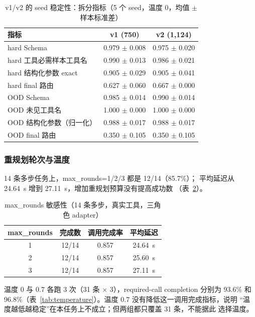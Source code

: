 \documentclass[UTF8,a4paper,12pt]{ctexart}
\begin{document}
\begin{table}[H]
  \centering
  \small
  \caption{v1/v2 的 seed 稳定性：拆分指标（5 个 seed，温度 0，均值 $\pm$ 样本标准差）}
  \label{tab:seed}
  \begin{tabular}{lcc}
    \toprule
    指标 & v1 (750) & v2 (1,124) \\
    \midrule
    hard Schema & 0.979 $\pm$ 0.008 & 0.975 $\pm$ 0.020 \\
    hard 工具必需样本工具名 & 0.990 $\pm$ 0.013 & 0.986 $\pm$ 0.021 \\
    hard 结构化参数 exact & 0.905 $\pm$ 0.029 & 0.905 $\pm$ 0.041 \\
    hard final 路由 & 0.627 $\pm$ 0.060 & 0.667 $\pm$ 0.000 \\
    OOD Schema & 0.985 $\pm$ 0.014 & 0.990 $\pm$ 0.014 \\
    OOD 未见工具名 & 1.000 $\pm$ 0.000 & 1.000 $\pm$ 0.000 \\
    OOD 结构化参数（归一化） & 0.988 $\pm$ 0.017 & 0.988 $\pm$ 0.017 \\
    OOD final 路由 & 0.350 $\pm$ 0.105 & 0.350 $\pm$ 0.105 \\
    \bottomrule
  \end{tabular}
\end{table}

\subsubsection{重规划轮次与温度}

14 条多步任务上，max\_rounds=1/2/3 都是 12/14（85.7\%）；
平均延迟从 24.64~s 增到 27.11~s，增加重规划预算没有提高成功数
（表~\ref{tab:rounds}）。

\begin{table}[H]
  \centering
  \small
  \caption{max\_rounds 敏感性（14 条多步，真实工具，三角色 adapter）}
  \label{tab:rounds}
  \begin{tabular}{cccc}
    \toprule
    max\_rounds & 完成数 & 调用完成率 & 平均延迟 \\
    \midrule
    1 & 12/14 & 0.857 & 24.64~s \\
    2 & 12/14 & 0.857 & 25.60~s \\
    3 & 12/14 & 0.857 & 27.11~s \\
    \bottomrule
  \end{tabular}
\end{table}

温度 0 与 0.7 各跑 3 次（31 条 $\times$ 3），required-call completion 分别为 93.6\% 和
96.8\%（表~\ref{tab:temperature}）。温度 0.7 没有降低这一调用完成指标，说明
“温度越低越稳定”在本任务上不成立；但两组都只覆盖 31 条，不能据此
选择温度。
\end{document}
